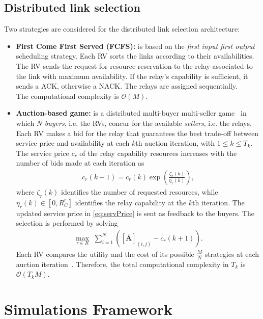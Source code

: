 \documentclass[journal]{IEEEtran}
\begin{document}
\subsection{Distributed link selection}

Two strategies are considered for the distributed link selection architecture:
\begin{itemize}[wide]
    \item \textbf{First Come First Served (FCFS):} is based on the \textit{first input first output} scheduling strategy. Each RV sorts the links according to their availabilities. The RV sends the request for resource reservation to the relay associated to the link with maximum availability. If the relay's capability is sufficient, it sends a ACK, otherwise a NACK. The relays are assigned sequentially.\\
    The computational complexity is $\mathcal{O}(M)$. %

    \item \textbf{Auction-based game:} is a distributed multi-buyer multi-seller game~\cite{zhong2020multi} in which $N$ \textit{buyers}, i.e. the RVs, concur for the available \textit{sellers}, i.e. the relays. Each RV makes a bid for the relay that guarantees the best trade-off between service price and availability at each $k$th auction iteration, with $1 \le k \le T_k$. The service price $c_r$ of the relay capability resources increases with the number of bids made at each iteration as
    \begin{align}\label{eq:servPrice}
        c_r(k+1) = c_r(k)\exp{\left(\frac{\zeta_r{(k)}}{\eta_r{(k)}}\right)},
    \end{align}
    where $\zeta_r{(k)}$ identifies the number of requested resources, while $\eta_r{(k)} \in [0, R_C^r]$ identifies the relay capability at the $k$th iteration. The updated service price in \eqref{eq:servPrice} is sent as feedback to the buyers. The selection is performed by solving 
    \begin{align}
       \max_{r\in R}\,\,\sum_{i=1}^N \left(\left[\mathbf{\bar{A}}\right]_{(i,j)} - c_r(k+1) \right).     \end{align}
 Each RV compares the utility and the cost of its possible $\frac{M}{N}$ strategies at each auction iteration~\cite{4739098}. Therefore, the total computational complexity in $T_k$ is $\mathcal{O}(T_k M)$.
  
\end{itemize}

\section{Simulations Framework} \label{sec:setup}
\end{document}

